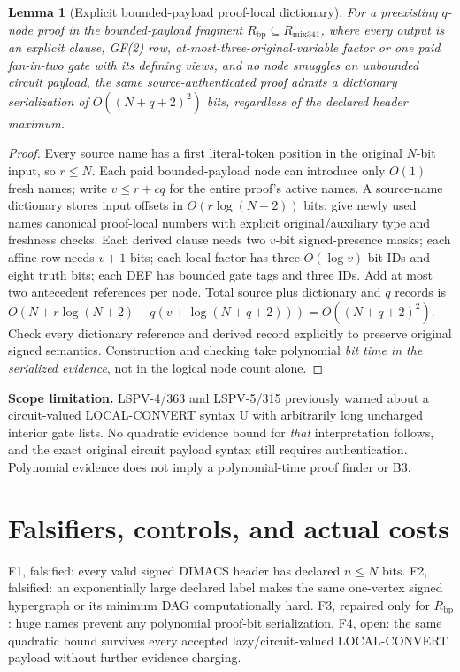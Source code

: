 \documentclass[11pt]{article}
\newtheorem{lemma}[theorem]{Lemma}
\begin{document}
\begin{lemma}[Explicit bounded-payload proof-local dictionary]
For a preexisting $q$-node proof in the bounded-payload fragment $R_{\mathrm{bp}}\subseteq R_{\mathrm{mix341}}$, where every output is an explicit clause, GF(2) row, at-most-three-original-variable factor or one paid fan-in-two gate with its defining views, and no node smuggles an unbounded circuit payload, the \emph{same} source-authenticated proof admits a dictionary serialization of $O((N+q+2)^2)$ bits, regardless of the declared header maximum.
\end{lemma}
\begin{proof}
Every source name has a first literal-token position in the original $N$-bit input, so $r\le N$. Each paid bounded-payload node can introduce only $O(1)$ fresh names; write $v\le r+cq$ for the entire proof's active names. A source-name dictionary stores input offsets in $O(r\log(N+2))$ bits; give newly used names canonical proof-local numbers with explicit original/auxiliary type and freshness checks. Each derived clause needs two $v$-bit signed-presence masks; each affine row needs $v+1$ bits; each local factor has three $O(\log v)$-bit IDs and eight truth bits; each DEF has bounded gate tags and three IDs. Add at most two antecedent references per node. Total source plus dictionary and $q$ records is $O(N+r\log(N+2)+q(v+\log(N+q+2)))=O((N+q+2)^2)$. Check every dictionary reference and derived record explicitly to preserve original signed semantics. Construction and checking take polynomial \emph{bit time in the serialized evidence}, not in the logical node count alone.
\end{proof}
\noindent\textbf{Scope limitation.} LSPV-4/363 and LSPV-5/315 previously warned about a circuit-valued LOCAL-CONVERT syntax U with arbitrarily long uncharged interior gate lists. No quadratic evidence bound for \emph{that} interpretation follows, and the exact original circuit payload syntax still requires authentication. Polynomial evidence does not imply a polynomial-time proof finder or B3.

\section*{Falsifiers, controls, and actual costs}
\noindent F1, falsified: every valid signed DIMACS header has declared $n\le N$ bits. F2, falsified: an exponentially large declared label makes the same one-vertex signed hypergraph or its minimum DAG computationally hard. F3, repaired only for $R_{\mathrm{bp}}$: huge names prevent any polynomial proof-bit serialization. F4, open: the same quadratic bound survives every accepted lazy/circuit-valued LOCAL-CONVERT payload without further evidence charging.
\end{document}
